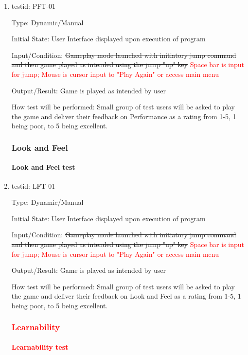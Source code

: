 \documentclass[12pt, titlepage]{article}
\begin{document}
\begin{enumerate}
\item{testid: PFT-01\\}

Type: Dynamic/Manual
					
Initial State: User Interface displayed upon execution of program
					
Input/Condition: \sout{Gameplay mode launched with initiatory jump command and then game played as intended using the jump "up" key} \textcolor{red}{Space bar is input for jump; Mouse is cursor input to "Play Again" or access main menu}
					
Output/Result: Game is played as intended by user
					
How test will be performed: Small group of test users will be asked to play the game and deliver their feedback on Performance as a rating from 1-5, 1 being poor, to 5 being excellent.

\subsubsection{Look and Feel}
		
\paragraph{Look and Feel test}

\item{testid: LFT-01\\}

Type: Dynamic/Manual
					
Initial State: User Interface displayed upon execution of program
					
Input/Condition: \sout{Gameplay mode launched with initiatory jump command and then game played as intended using the jump "up" key} \textcolor{red}{Space bar is input for jump; Mouse is cursor input to "Play Again" or access main menu}
					
Output/Result: Game is played as intended by user
					
How test will be performed: Small group of test users will be asked to play the game and deliver their feedback on Look and Feel as a rating from 1-5, 1 being poor, to 5 being excellent.

\textcolor{red}{\subsubsection{Learnability}}
		
\textcolor{red}{\paragraph{Learnability test}}


\end{enumerate}
\end{document}
